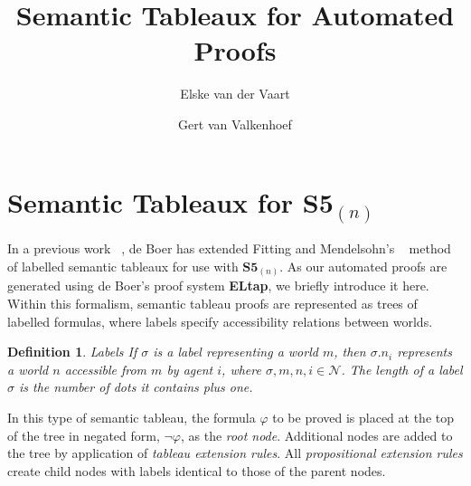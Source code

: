 \documentclass[11pt,a4paper]{article}
\author{Elske van der Vaart \and Gert van Valkenhoef}
\title{Semantic Tableaux for Automated Proofs}
\newtheorem{defs}{Definition}[section]
\begin{document}
\maketitle

\section{Semantic Tableaux for $\textbf{S5}_{(n)}$}
In a previous work ~\cite{these}, de Boer has extended Fitting and Mendelsohn's ~\cite{fit_men} method of labelled semantic tableaux for use with $\textbf{S5}_{(n)}$. As our automated proofs are generated using de Boer's proof system {\bf ELtap}, we briefly introduce it here. Within this formalism, semantic tableau proofs are represented as trees of labelled formulas, where labels specify accessibility relations between worlds.

\begin{defs}{\it Labels} \newline
If $\sigma$ is a label representing a world $m$, then $\sigma.n_i$ represents a world $n$ accessible from $m$ by agent $i$, where $\sigma,m,n,i \in \mathcal{N}$. The {\it length} of a label $\sigma$ is the number of dots it contains plus one.~\cite{beck_gore} \end{defs} 

In this type of semantic tableau, the formula $\varphi$ to be proved is placed at the top of the tree in negated form, $\neg \varphi$, as the {\it root node}. Additional nodes are added to the tree by application of {\it tableau extension rules}. All {\it propositional extension rules} create child nodes with labels identical to those of the parent nodes.
\end{document}
